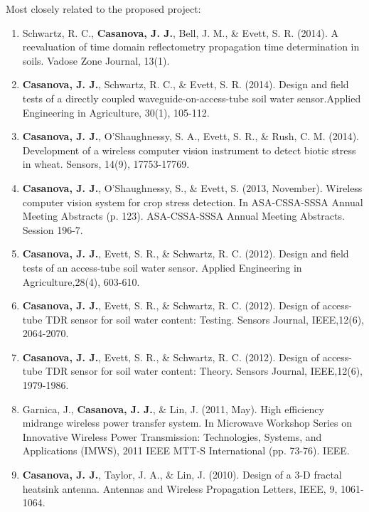 Most closely related to the proposed project:	
\begin{enumerate}
	
\item Schwartz, R. C., \textbf{Casanova, J. J.}, Bell, J. M., \& Evett, S. R. (2014). A reevaluation of time domain reflectometry propagation time determination in soils. Vadose Zone Journal, 13(1).	

\item \textbf{Casanova, J. J.}, Schwartz, R. C., \& Evett, S. R. (2014). Design and field tests of a directly coupled waveguide-on-access-tube soil water sensor.Applied Engineering in Agriculture, 30(1), 105-112.

\item \textbf{Casanova, J. J.}, O'Shaughnessy, S. A., Evett, S. R., \& Rush, C. M. (2014). Development of a wireless computer vision instrument to detect biotic stress in wheat. Sensors, 14(9), 17753-17769.

\item \textbf{Casanova, J. J.}, O’Shaughnessy, S., \& Evett, S. (2013, November). Wireless computer vision system for crop stress detection. In ASA-CSSA-SSSA Annual Meeting Abstracts (p. 123). ASA-CSSA-SSSA Annual Meeting Abstracts. Session 196-7.

\item \textbf{Casanova, J. J.}, Evett, S. R., \& Schwartz, R. C. (2012). Design and field tests of an access-tube soil water sensor. Applied Engineering in Agriculture,28(4), 603-610.

\item \textbf{Casanova, J. J.}, Evett, S. R., \& Schwartz, R. C. (2012). Design of access-tube TDR sensor for soil water content: Testing. Sensors Journal, IEEE,12(6), 2064-2070.

\item \textbf{Casanova, J. J.}, Evett, S. R., \& Schwartz, R. C. (2012). Design of access-tube TDR sensor for soil water content: Theory. Sensors Journal, IEEE,12(6), 1979-1986.

\item Garnica, J., \textbf{Casanova, J. J.}, \& Lin, J. (2011, May). High efficiency midrange wireless power transfer system. In Microwave Workshop Series on Innovative Wireless Power Transmission: Technologies, Systems, and Applications (IMWS), 2011 IEEE MTT-S International (pp. 73-76). IEEE.

\item \textbf{Casanova, J. J.}, Taylor, J. A., \& Lin, J. (2010). Design of a 3-D fractal heatsink antenna. Antennas and Wireless Propagation Letters, IEEE, 9, 1061-1064.


\end{enumerate}

